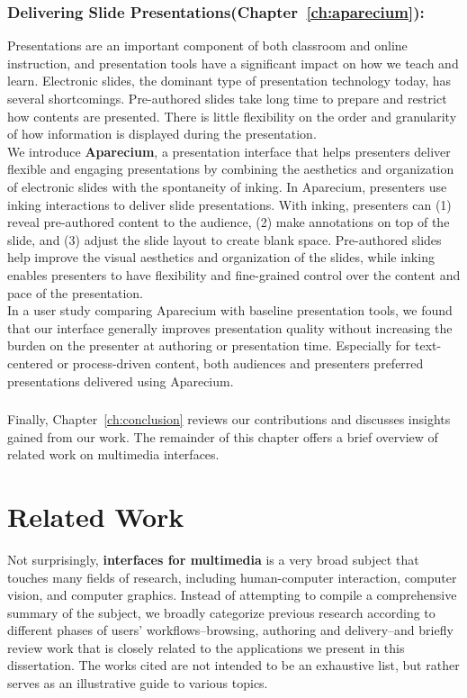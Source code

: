 \subsubsection*{Delivering Slide Presentations(Chapter~\ref{ch:aparecium}):}
Presentations are an important component of both classroom
and online instruction, and presentation tools have a significant impact on how we teach and learn. Electronic slides, the dominant type of presentation technology today, has several shortcomings. Pre-authored slides take long time to prepare and restrict how contents are presented. There is little flexibility on the order and granularity of how information is displayed during the presentation.\\

We introduce \textbf{Aparecium}, a presentation interface that helps presenters deliver flexible and engaging presentations by combining
the aesthetics and organization of electronic slides with
the spontaneity of inking. In Aparecium, presenters use inking
interactions to deliver slide presentations. With inking, presenters
can (1) reveal pre-authored content to the audience,
(2) make annotations on top of the slide, and (3) adjust the
slide layout to create blank space. Pre-authored slides help improve
the visual aesthetics and organization of the slides, while
inking enables presenters to have flexibility and fine-grained
control over the content and pace of the presentation.\\

In a user study comparing Aparecium with baseline presentation
tools, we found that our interface generally improves presentation
quality without increasing the burden on the presenter
at authoring or presentation time. Especially for text-centered
or process-driven content, both audiences and presenters preferred
presentations delivered using Aparecium.\\

\subsubsection*{}
Finally, Chapter~\ref{ch:conclusion} reviews our contributions and discusses insights gained from our work. The remainder of this chapter offers a brief overview of related work on multimedia interfaces.  

\section{Related Work}
\label{main-relatedwork}
Not surprisingly, \textbf{interfaces for multimedia} is a very broad subject that touches many fields of research, including human-computer interaction, computer vision, and computer graphics. Instead of attempting to compile a comprehensive summary of the subject, we broadly categorize previous research according to different phases of users' workflows--browsing, authoring and delivery--and briefly review work that is closely related to the applications we present in this dissertation. The works cited are not intended to be an exhaustive list, but rather serves as an illustrative guide to various topics.


